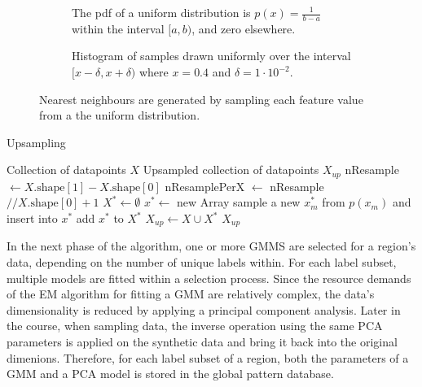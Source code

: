 \documentclass[../../main.tex]{subfiles}
\begin{document}
 \begin{figure}%
    \centering%
    \begin{subfigure}[b]{0.49\textwidth}%
        \centering\captionsetup{width=.8\linewidth}%
        \caption{The pdf of a uniform distribution is $p(x) = \frac{1}{b-a}$ within the interval $[a, b)$, and zero elsewhere.}%
        \label{subfig:uniform_dist}%
    \end{subfigure}%
    \hfill%
    \begin{subfigure}[b]{0.49\textwidth}%
        \centering\captionsetup{width=.8\linewidth}%
        \caption{Histogram of  samples drawn uniformly over the interval $[x-\delta, x+\delta)$ where $x=0.4$ and $\delta=1 \cdot 10^{-2}$.}%
        \label{subfig:hist_nn}%
    \end{subfigure}%
    \caption{Nearest neighbours are generated by sampling each feature value from a the uniform distribution.}%
    \label{fig:uniform_dist_nn}%
\end{figure}%

 \begin{algorithm}
    \caption{Upsampling}
    \label{alg:upsampling}
 
    \begin{algorithmic}[1]
        \REQUIRE Collection of datapoints $X$
        \ENSURE Upsampled collection of datapoints $X_{up}$
        \STATE nResample $\leftarrow X.\text{shape}[1] - X.\text{shape}[0]$ 
        \STATE nResamplePerX $\leftarrow$ nResample $// X.\text{shape}[0] + 1$
        \STATE $X^* \leftarrow \emptyset$
            \STATE $x^* \leftarrow$ new Array
                \STATE sample a new $x_m^*$ from $p(x_m)$ and insert into $x^*$
            \ENDFOR
            \STATE add $x^*$ to $X^*$
        \ENDFOR
        \STATE $X_{up} \leftarrow X \cup X^*$
        \RETURN $X_{up}$

    \end{algorithmic}
 \end{algorithm}

 In the next phase of the algorithm, one or more GMMS are selected for a region's data, depending on the number of unique labels within. For each label subset, multiple models are fitted within a selection process. Since the resource demands of the EM algorithm for fitting a GMM are relatively complex, the data's dimensionality is reduced by applying a principal component analysis. Later in the course, when sampling data, the inverse operation using the same PCA parameters is applied on the synthetic data and bring it back into the original dimenions. Therefore, for each label subset of a region, both the parameters of a GMM and a PCA model is stored in the global pattern database.
\end{document}
